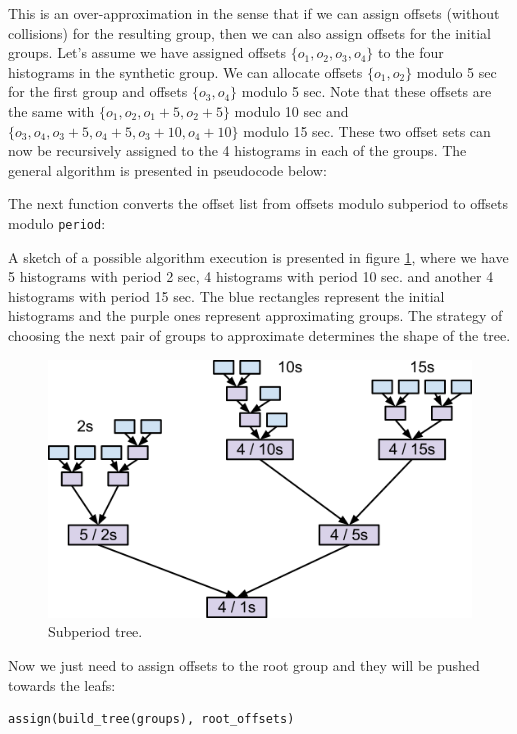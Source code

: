 This is an over-approximation in the sense that if we can assign offsets (without collisions) for the resulting group, then we can also assign offsets for the initial groups. Let’s assume we have assigned offsets $\{o_1,o_2,o_3,o_4\}$ to the four histograms in the synthetic group. We can allocate offsets $\{o_1, o_2\}$ modulo 5 sec for the first group and offsets $\{o_3, o_4\}$ modulo 5 sec. Note that these offsets are the same with $\{o_1, o_2, o_1 + 5, o_2 + 5\}$ modulo 10 sec and $\{o_3, o_4, o_3 + 5, o_4 + 5, o_3 + 10, o_4 + 10\}$ modulo 15 sec. These two offset sets can now be recursively assigned to the 4 histograms in each of the groups. The general algorithm is presented in pseudocode below:

The next function converts the offset list from offsets modulo subperiod to offsets modulo \verb+period+:

A sketch of a possible algorithm execution is presented in figure \ref{fig:subperiod_tree}, where we have 5 histograms with period 2 sec, 4 histograms with period 10 sec. and another 4 histograms with period 15 sec. The blue rectangles represent the initial histograms and the purple ones represent approximating groups. The strategy of choosing the next pair of groups to approximate determines the shape of the tree.
\begin{figure}[ht!]
\centering
\includegraphics[scale=0.7]{Images/subperiod_tree.png}
\caption{Subperiod tree.}
\label{fig:subperiod_tree}
\end{figure}

Now we just need to assign offsets to the root group and they will be pushed towards the leafs:
\begin{verbatim}
assign(build_tree(groups), root_offsets)
\end{verbatim}

